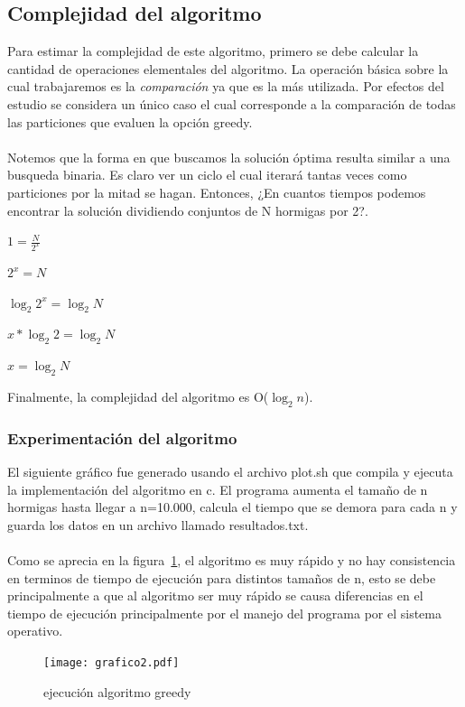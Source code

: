 \documentclass[11pt,spanish]{article}
\begin{document}
\subsection{Complejidad del algoritmo}
Para estimar la complejidad de este algoritmo, primero se debe calcular 	la cantidad de operaciones elementales del algoritmo. La operación básica sobre la cual trabajaremos es la \emph{comparación} ya que es la más utilizada. Por efectos del estudio se considera un único caso el cual corresponde a la comparación de todas las particiones que evaluen la opción greedy.\\\\Notemos que la forma en que buscamos la solución óptima resulta similar a una busqueda binaria. Es claro ver un ciclo el cual iterará tantas veces como particiones por la mitad se hagan. Entonces, ¿En cuantos tiempos podemos encontrar la solución dividiendo conjuntos de N hormigas por 2?.
\begin{center}$1 = \frac{N}{2^x}$\end{center}
\begin{center}$2^x = N$\end{center}
\begin{center}$\log_2{2^x} = \log_2{N}$\end{center}
\begin{center}$x*\log_2{2} = \log_2{N}$\end{center}
\begin{center}$x = \log_2{N}$\end{center}
Finalmente, la complejidad del algoritmo es O($\log_2{n}$).
\newpage
\subsubsection{Experimentación del algoritmo}
El siguiente gráfico fue generado usando el archivo plot.sh que compila y ejecuta la implementación del algoritmo en c. El programa aumenta el tamaño de n hormigas hasta llegar a n=10.000, calcula el tiempo que se demora para cada n y guarda los datos en un archivo llamado resultados.txt.\\\\Como se aprecia en la figura~\ref{fig:grafico}, el algoritmo es muy rápido y no hay consistencia en terminos de tiempo de ejecución para distintos tamaños de n, esto se debe principalmente a que al algoritmo ser muy rápido se causa diferencias en el tiempo de ejecución principalmente por el manejo del programa por el sistema operativo.
\begin{figure}[h]
    \centering
    \texttt{[image: grafico2.pdf]}
    \caption{ejecución algoritmo greedy}
    \label{fig:grafico}
\end{figure}
\end{document}
